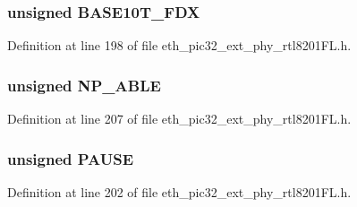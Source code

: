 \hypertarget{union_____a_n_l_p_a_dbits__t_a60f1f5eeed205a15bb647dffff3a2ee3}{}
\subsubsection[{B\+A\+S\+E10\+T\+\_\+\+F\+D\+X}]{\setlength{\rightskip}{0pt plus 5cm}unsigned B\+A\+S\+E10\+T\+\_\+\+F\+D\+X}\label{union_____a_n_l_p_a_dbits__t_a60f1f5eeed205a15bb647dffff3a2ee3}


Definition at line 198 of file eth\+\_\+pic32\+\_\+ext\+\_\+phy\+\_\+rtl8201\+F\+L.\+h.

\hypertarget{union_____a_n_l_p_a_dbits__t_a4502f03b3664f0c1b02bfbfdae50f349}{}
\subsubsection[{N\+P\+\_\+\+A\+B\+L\+E}]{\setlength{\rightskip}{0pt plus 5cm}unsigned N\+P\+\_\+\+A\+B\+L\+E}\label{union_____a_n_l_p_a_dbits__t_a4502f03b3664f0c1b02bfbfdae50f349}


Definition at line 207 of file eth\+\_\+pic32\+\_\+ext\+\_\+phy\+\_\+rtl8201\+F\+L.\+h.

\hypertarget{union_____a_n_l_p_a_dbits__t_ad4492e8a008bd744e8ee4a73bc202e78}{}
\subsubsection[{P\+A\+U\+S\+E}]{\setlength{\rightskip}{0pt plus 5cm}unsigned P\+A\+U\+S\+E}\label{union_____a_n_l_p_a_dbits__t_ad4492e8a008bd744e8ee4a73bc202e78}


Definition at line 202 of file eth\+\_\+pic32\+\_\+ext\+\_\+phy\+\_\+rtl8201\+F\+L.\+h.

